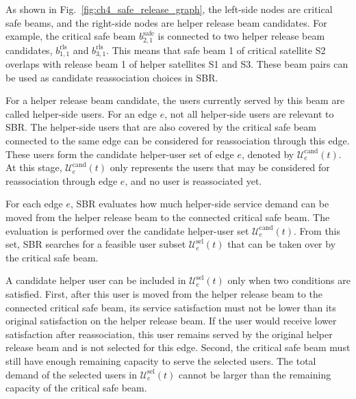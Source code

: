 As shown in Fig.~\ref{fig:ch4_safe_release_graph}, the left-side nodes are critical safe beams, and the right-side nodes are helper release beam candidates. For example, the critical safe beam $b_{2,1}^{\mathrm{safe}}$ is connected to two helper release beam candidates, $b_{1,1}^{\mathrm{rls}}$ and $b_{3,1}^{\mathrm{rls}}$. This means that safe beam 1 of critical satellite S2 overlaps with release beam 1 of helper satellites S1 and S3. These beam pairs can be used as candidate reassociation choices in SBR.

\setcounter{subsubsection}{0}
For a helper release beam candidate, the users currently served by this beam are called helper-side users. For an edge $e$, not all helper-side users are relevant to SBR. The helper-side users that are also covered by the critical safe beam connected to the same edge can be considered for reassociation through this edge. These users form the candidate helper-user set of edge $e$, denoted by $\mathcal{U}_e^{\mathrm{cand}}(t)$. At this stage, $\mathcal{U}_e^{\mathrm{cand}}(t)$ only represents the users that may be considered for reassociation through edge $e$, and no user is reassociated yet.

For each edge $e$, SBR evaluates how much helper-side service demand can be moved from the helper release beam to the connected critical safe beam. The evaluation is performed over the candidate helper-user set $\mathcal{U}_e^{\mathrm{cand}}(t)$. From this set, SBR searches for a feasible user subset $\mathcal{U}_e^{\mathrm{sel}}(t)$ that can be taken over by the critical safe beam.

A candidate helper user can be included in $\mathcal{U}_e^{\mathrm{sel}}(t)$ only when two conditions are satisfied. First, after this user is moved from the helper release beam to the connected critical safe beam, its service satisfaction must not be lower than its original satisfaction on the helper release beam. If the user would receive lower satisfaction after reassociation, this user remains served by the original helper release beam and is not selected for this edge. Second, the critical safe beam must still have enough remaining capacity to serve the selected users. The total demand of the selected users in $\mathcal{U}_e^{\mathrm{sel}}(t)$ cannot be larger than the remaining capacity of the critical safe beam.


